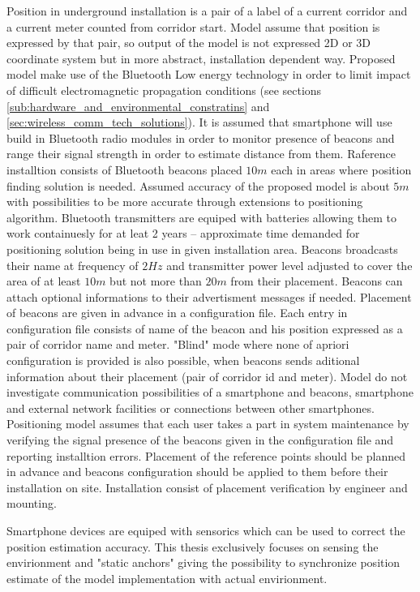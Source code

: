 \documentclass[../main.tex]{subfiles}
\begin{document}
Position in underground installation is a pair of a label of a current corridor and a current meter counted from corridor start. Model assume that position is expressed by that pair, so output of the model is not expressed 2D or 3D coordinate system but in more abstract, installation dependent way. Proposed model make use of the Bluetooth Low energy technology in order to limit impact of difficult electromagnetic propagation conditions (see sections \ref{sub:hardware_and_environmental_constratins} and \ref{sec:wireless_comm_tech_solutions}). It is assumed that smartphone will use build in Bluetooth radio modules in order to monitor presence of beacons and range their signal strength in order to estimate distance from them. Raference installtion consists of Bluetooth beacons placed $10m$ each in areas where position finding solution is needed. Assumed accuracy of the proposed model is about $5m$ with possibilities to be more accurate through extensions to positioning algorithm. Bluetooth transmitters are equiped with batteries allowing them to work containuesly for at leat 2 years -- approximate time demanded for positioning solution being in use in given installation area. Beacons broadcasts their name at frequency of $2Hz$ and transmitter power level adjusted to cover the area of at least $10m$ but not more than $20m$ from their placement. Beacons can attach optional informations to their advertisment messages if needed. Placement of beacons are given in advance in a configuration file. Each entry in configuration file consists of name of the beacon and his position expressed as a pair of corridor name and meter. "Blind" mode where none of apriori configuration is provided is also possible, when beacons sends aditional information about their placement (pair of corridor id and meter). Model do not investigate communication possibilities of a smartphone and beacons, smartphone and external network facilities or connections between other smartphones. Positioning model assumes that each user takes a part in system maintenance by verifying the signal presence of the beacons given in the configuration file and reporting installtion errors. Placement of the reference points should be planned in advance and beacons configuration should be applied to them before their installation on site. Installation consist of placement verification by engineer and mounting.

Smartphone devices are equiped with sensorics which can be used to correct the position estimation accuracy. This thesis exclusively focuses on sensing the envirionment and "static anchors" giving the possibility to synchronize position estimate of the model implementation with actual envirionment.
\end{document}
